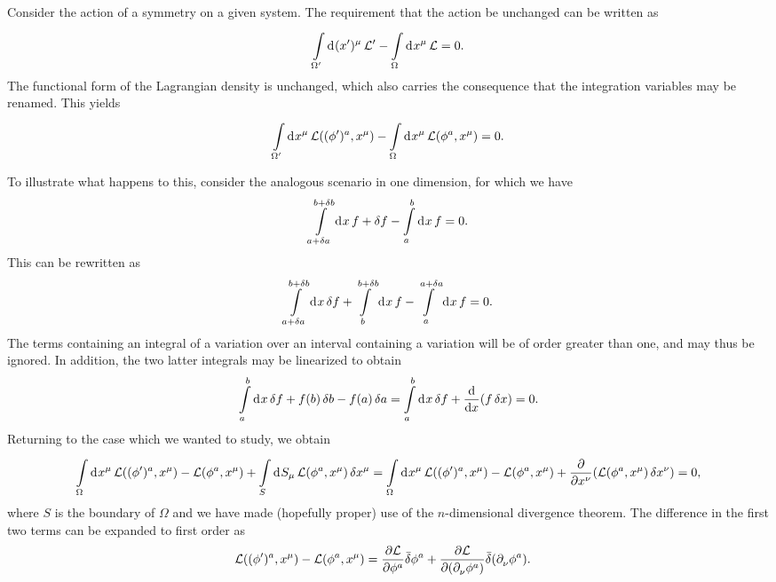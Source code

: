 Consider the action of a symmetry on a given system. The requirement that the action be unchanged can be written as
\begin{align*}
	\int\limits_{\Omega^{\prime}}^{}\dd[]{(x^{\prime})^{\mu}}\mathcal{L}^{\prime} - \int\limits_{\Omega}^{}\dd[]{x^{\mu}}\mathcal{L} = 0.
\end{align*}
The functional form of the Lagrangian density is unchanged, which also carries the consequence that the integration variables may be renamed. This yields
\begin{align*}
	\int\limits_{\Omega^{\prime}}^{}\dd[]{x^{\mu}}\mathcal{L}((\phi^{\prime})^{a}, x^{\mu}) - \int\limits_{\Omega}^{}\dd[]{x^{\mu}}\mathcal{L}(\phi^{a}, x^{\mu}) = 0.
\end{align*}

To illustrate what happens to this, consider the analogous scenario in one dimension, for which we have
\begin{align*}
	\int\limits_{a + \var{a}}^{b + \var{b}}\dd[]{x}f + \var{f} - \int\limits_{a}^{b}\dd[]{x}f = 0.
\end{align*}
This can be rewritten as
\begin{align*}
	\int\limits_{a + \var{a}}^{b + \var{b}}\dd[]{x}\var{f} + \int\limits_{b}^{b + \var{b}}\dd[]{x}f - \int\limits_{a}^{a + \var{a}}\dd[]{x}f = 0.
\end{align*}
The terms containing an integral of a variation over an interval containing a variation will be of order greater than one, and may thus be ignored. In addition, the two latter integrals may be linearized to obtain
\begin{align*}
	\int\limits_{a}^{b}\dd[]{x}\var{f} + f(b)\var{b} - f(a)\var{a} = \int\limits_{a}^{b}\dd[]{x}\var{f} + \dv{x}(f\var{x}) = 0.
\end{align*}
Returning to the case which we wanted to study, we obtain
\begin{align*}
	\int\limits_{\Omega}^{}\dd[]{x^{\mu}}\mathcal{L}((\phi^{\prime})^{a}, x^{\mu}) - \mathcal{L}(\phi^{a}, x^{\mu}) + \int\limits_{S}^{}\dd[]{S_{\mu}}\mathcal{L}(\phi^{a}, x^{\mu})\var{x^{\mu}} = \int\limits_{\Omega}^{}\dd[]{x^{\mu}}\mathcal{L}((\phi^{\prime})^{a}, x^{\mu}) - \mathcal{L}(\phi^{a}, x^{\mu}) + \pdv{x^{\nu}}(\mathcal{L}(\phi^{a}, x^{\mu})\var{x^{\nu}}) = 0,
\end{align*}
where $S$ is the boundary of $\Omega$ and we have made (hopefully proper) use of the $n$-dimensional divergence theorem. The difference in the first two terms can be expanded to first order as
\begin{align*}
	\mathcal{L}((\phi^{\prime})^{a}, x^{\mu}) - \mathcal{L}(\phi^{a}, x^{\mu}) &= \pdv{\ensuremath{\mathcal{L}}}{\phi^{a}}\bar{\delta}\phi^{a} + \pdv{\ensuremath{\mathcal{L}}}{(\partial^{}_{\nu}\phi^{a})}\bar{\delta}(\partial^{}_{\nu}\phi^{a}).
\end{align*}
